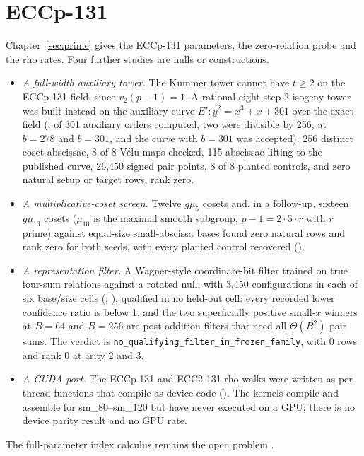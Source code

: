 \section{ECCp-131}\label{sec:pt-eccp131}

Chapter~\ref{sec:prime} gives the ECCp-131 parameters, the zero-relation
probe and the rho rates. Four further studies are nulls or constructions.
\begin{itemize}
\item \emph{A full-width auxiliary tower.} The Kummer tower cannot have
  $t\ge2$ on the ECCp-131 field, since $v_2(p-1)=1$. A rational eight-step
  2-isogeny tower was built instead on the auxiliary curve
  $E':y^2=x^3+x+301$ over the exact field
  (; of 301 auxiliary
  orders computed, two were divisible by 256, at $b=278$ and $b=301$, and the
  curve with $b=301$ was accepted): 256
  distinct coset abscissae, 8 of 8 V\'elu maps checked, 115 abscissae
  lifting to the published curve, 26{,}450 signed pair points, 8 of 8
  planted controls, and zero natural setup or target rows, rank zero.
\item \emph{A multiplicative-coset screen.} Twelve $g\mu_5$ cosets and,
  in a follow-up, sixteen $g\mu_{10}$ cosets ($\mu_{10}$ is the maximal
  smooth subgroup, $p-1=2\cdot5\cdot r$ with $r$ prime) against equal-size
  small-abscissa bases found zero natural rows and rank zero for both seeds,
  with every planted control recovered
  ().
\item \emph{A representation filter.} A Wagner-style coordinate-bit filter
  trained on true four-sum relations against a rotated null, with 3{,}450
  configurations in each of six base/size cells
  (;
  ), qualified in
  no held-out cell: every recorded lower confidence ratio is below 1, and
  the two superficially positive small-$x$ winners at $B=64$ and $B=256$ are
  post-addition filters that need all $\Theta(B^2)$ pair sums. The verdict is
  \texttt{no\_qualifying\_filter\_in\_frozen\_family}, with 0 rows and rank 0
  at arity 2 and 3.
\item \emph{A CUDA port.} The ECCp-131 and ECC2-131 rho walks were written
  as per-thread functions that compile as device code
  (). The kernels compile and
  assemble for sm\_80--sm\_120 but have never executed on a GPU; there is no
  device parity result and no GPU rate.
\end{itemize}
The full-parameter index calculus remains the open problem
.

